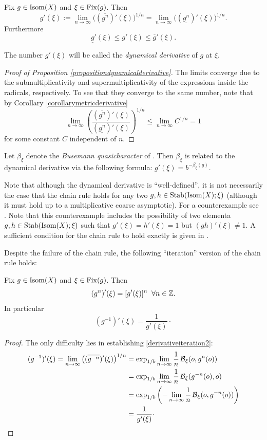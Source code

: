 \begin{proposition}
\label{propositiondynamicalderivative}
Fix $g\in\operatorname{Isom}(X)$ and $\xi\in\operatorname{Fix}(g)$. Then
\[
g'(\xi) := \lim_{n\to\infty} \big( (\overline{g^n})'(\xi) \bigr)^{1/n} = \lim_{n\to\infty} \bigl( (\underline{g^n})'(\xi) \bigr)^{1/n}.
\]
Furthermore
\[
\underline g'(\xi)\leq g'(\xi) \leq \overline g'(\xi).
\]
\end{proposition}
The number $g'(\xi)$ will be called the \emph{dynamical derivative} of $g$ at $\xi$.
\begin{proof}[Proof of Proposition \ref{propositiondynamicalderivative}]
The limits converge due to the submultiplicativity and supermultiplicativity of the expressions inside the radicals, respectively. To see that they converge to the same number, note that by Corollary \ref{corollarymetricderivative}
\[
\lim_{n\to\infty} \left(\frac{(\overline{g^n})'(\xi) }{(\underline{g^n})'(\xi) }\right)^{1/n} \leq \lim_{n\to\infty} C^{1/n} = 1
\]
for some constant $C$ independent of $n$.
\end{proof}
\begin{remark}
Let $\beta_\xi$ denote the \emph{Busemann quasicharacter} of \cite[p.14]{CCMT}. Then $\beta_\xi$ is related to the dynamical derivative via the following formula: $g'(\xi) = b^{-\beta_\xi(g)}$.
\end{remark}
Note that although the dynamical derivative is ``well-defined'', it is not necessarily the case that the chain rule holds for any two $g,h\in\operatorname{Stab}(\operatorname{Isom}(X);\xi)$ (although it must hold up to a multiplicative coarse asymptotic). For a counterexample see \cite[Example 3.12]{CCMT}. Note that this counterexample includes the possibility of two elementa $g,h\in\operatorname{Stab}(\operatorname{Isom}(X);\xi)$ such that $g'(\xi) = h'(\xi) = 1$ but $(gh)'(\xi)\neq 1$. A sufficient condition for the chain rule to hold exactly is given in \cite[Corollary 3.9]{CCMT}.

Despite the failure of the chain rule, the following ``iteration'' version of the chain rule holds:

\begin{proposition}
\label{propositionderivativeiteration}
Fix $g\in\operatorname{Isom}(X)$ and $\xi\in\operatorname{Fix}(g)$. Then
\[
(g^n)'(\xi) = [g'(\xi)]^n \all n\in\Z.
\]
In particular
\begin{equation}
\label{derivativeiteration2}
(g^{-1})'(\xi) = \frac{1}{g'(\xi)}\cdot
\end{equation}
\end{proposition}
\begin{proof}
The only difficulty lies in establishing \eqref{derivativeiteration2}:
\begin{align*}
(g^{-1})'(\xi) = \lim_{n\to\infty} \big((\overline{g^{-n}})'(\xi)\big)^{1/n}
&= \exp_{1/b} \lim_{n\to\infty} \frac{1}{n} \operatorname{\mathcal B}_\xi(o,g^n(o))\\
&= \exp_{1/b} \lim_{n\to\infty} \frac{1}{n} \operatorname{\mathcal B}_\xi(g^{-n}(o),o)\\
&= \exp_{1/b} \left( -\lim_{n\to\infty} \frac{1}{n} \operatorname{\mathcal B}_\xi(o,g^{-n}(o)) \right) \\
&= \frac 1{g'(\xi)}\cdot
\end{align*}
\end{proof}

